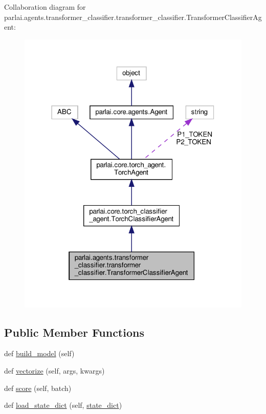 Collaboration diagram for parlai.\+agents.\+transformer\+\_\+classifier.\+transformer\+\_\+classifier.\+Transformer\+Classifier\+Agent\+:
\nopagebreak
\begin{figure}[H]
\begin{center}
\leavevmode
\includegraphics[width=318pt]{d7/d77/classparlai_1_1agents_1_1transformer__classifier_1_1transformer__classifier_1_1TransformerClassifierAgent__coll__graph}
\end{center}
\end{figure}
\subsection*{Public Member Functions}
\begin{DoxyCompactItemize}
\item 
def \hyperlink{classparlai_1_1agents_1_1transformer__classifier_1_1transformer__classifier_1_1TransformerClassifierAgent_a10a0e65863e4e7b6a0ac30d3ff6f3c5f}{build\+\_\+model} (self)
\item 
def \hyperlink{classparlai_1_1agents_1_1transformer__classifier_1_1transformer__classifier_1_1TransformerClassifierAgent_afff32a6e789532e0bf6223b466e43588}{vectorize} (self, args, kwargs)
\item 
def \hyperlink{classparlai_1_1agents_1_1transformer__classifier_1_1transformer__classifier_1_1TransformerClassifierAgent_a8d3cb4862ab598c8f93239255dd65eeb}{score} (self, batch)
\item 
def \hyperlink{classparlai_1_1agents_1_1transformer__classifier_1_1transformer__classifier_1_1TransformerClassifierAgent_a2799356b935d49c3fa522f07428ff1c3}{load\+\_\+state\+\_\+dict} (self, \hyperlink{classparlai_1_1core_1_1torch__agent_1_1TorchAgent_a9f89e606931a4622a5c6a6f6b832235c}{state\+\_\+dict})
\end{DoxyCompactItemize}
